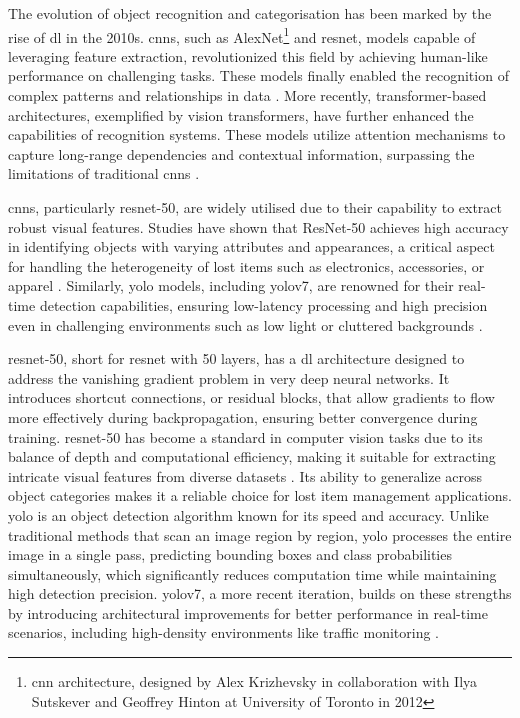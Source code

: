 The evolution of object recognition and categorisation has been marked by the rise of \ac{dl} in the 2010s. \acp{cnn}, such as AlexNet\footnote{\ac{cnn} architecture, designed by Alex Krizhevsky in collaboration with Ilya Sutskever and Geoffrey Hinton at University of Toronto in 2012} and \ac{resnet}, models capable of leveraging feature extraction, revolutionized this field by achieving human-like performance on challenging tasks. These models finally enabled the recognition of complex patterns and relationships in data \cites{He2015, Krizhevsky2017}. More recently, transformer-based architectures, exemplified by vision transformers, have further enhanced the capabilities of recognition systems. These models utilize attention mechanisms to capture long-range dependencies and contextual information, surpassing the limitations of traditional \acp{cnn} \cite{Dosovitskiy2020}.

\acp{cnn}, particularly \ac{resnet}-50, are widely utilised due to their capability to extract robust visual features. Studies have shown that ResNet-50 achieves high accuracy in identifying objects with varying attributes and appearances, a critical aspect for handling the heterogeneity of lost items such as electronics, accessories, or apparel \cites{Prawira2024, Ghazal2016, Liu2022}. Similarly, \ac{yolo} models, including \ac{yolo}v7, are renowned for their real-time detection capabilities, ensuring low-latency processing and high precision even in challenging environments such as low light or cluttered backgrounds \cites{Sharma2024, Vedanth2024}.

\ac{resnet}-50, short for \acl{resnet} with 50 layers, has a \ac{dl} architecture designed to address the vanishing gradient problem in very deep neural networks. It introduces shortcut connections, or residual blocks, that allow gradients to flow more effectively during backpropagation, ensuring better convergence during training. \ac{resnet}-50 has become a standard in computer vision tasks due to its balance of depth and computational efficiency, making it suitable for extracting intricate visual features from diverse datasets \cite{He2015}. Its ability to generalize across object categories makes it a reliable choice for lost item management applications. \ac{yolo} is an object detection algorithm known for its speed and accuracy. Unlike traditional methods that scan an image region by region, \ac{yolo} processes the entire image in a single pass, predicting bounding boxes and class probabilities simultaneously, which significantly reduces computation time while maintaining high detection precision. \ac{yolo}v7, a more recent iteration, builds on these strengths by introducing architectural improvements for better performance in real-time scenarios, including high-density environments like traffic monitoring \cites{Redmon2015, Wang2022}.

